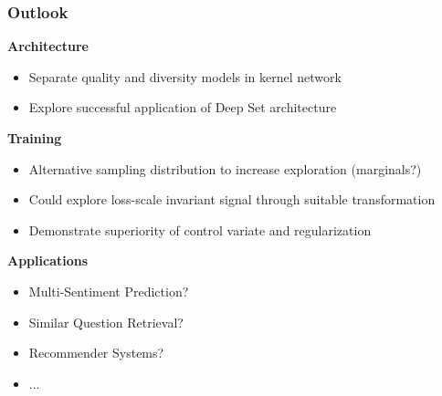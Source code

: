 \documentclass[aspectratio=43]{beamer}
\begin{document}
\begin{frame}
\frametitle{Outlook}
\textbf{Architecture}
\begin{itemize}
\item{Separate quality and diversity models in kernel network}
\item{Explore successful application of Deep Set architecture}
\end{itemize}
\textbf{Training}
\begin{itemize}
\item{Alternative sampling distribution to increase exploration (marginals?)}
\item{Could explore loss-scale invariant signal through suitable transformation}
\item{Demonstrate superiority of control variate and regularization}
\end{itemize}
\textbf{Applications}
\begin{itemize}
\item{Multi-Sentiment Prediction?}
\item{Similar Question Retrieval?}
\item{Recommender Systems?}
\item{...}
\end{itemize}
\end{frame}
\begin{frame}
{}

\end{frame}
\end{document}
